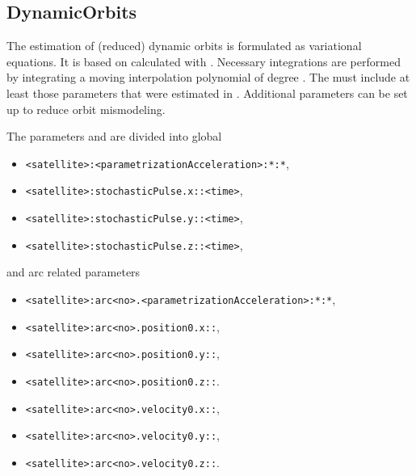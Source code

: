\subsection{DynamicOrbits}\label{slrParametrizationType:dynamicOrbits}
The estimation of (reduced) dynamic orbits is formulated as variational equations.
It is based on  calculated with .
Necessary integrations are performed by integrating a moving interpolation polynomial of degree .
The  must include at least those
parameters that were estimated in .
Additional  parameters can be set up to reduce orbit mismodeling.

The parameters and  are divided into global
\begin{itemize}
\item \verb|<satellite>:<parametrizationAcceleration>:*:*|,
\item \verb|<satellite>:stochasticPulse.x::<time>|,
\item \verb|<satellite>:stochasticPulse.y::<time>|,
\item \verb|<satellite>:stochasticPulse.z::<time>|,
\end{itemize}
and arc related parameters
\begin{itemize}
\item \verb|<satellite>:arc<no>.<parametrizationAcceleration>:*:*|,
\item \verb|<satellite>:arc<no>.position0.x::|,
\item \verb|<satellite>:arc<no>.position0.y::|,
\item \verb|<satellite>:arc<no>.position0.z::|.
\item \verb|<satellite>:arc<no>.velocity0.x::|,
\item \verb|<satellite>:arc<no>.velocity0.y::|,
\item \verb|<satellite>:arc<no>.velocity0.z::|.
\end{itemize}



